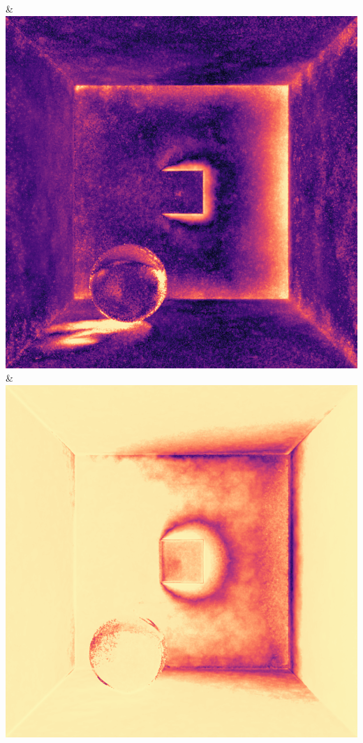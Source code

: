 & \includegraphics[width=\linewidth]{figures/py/tests/quality_comparison/nrc+bt_1spp_ajar_caustic_flip.png}
& \includegraphics[width=\linewidth]{figures/py/tests/quality_comparison/nrc+lt_1spp_ajar_caustic_flip.png}
